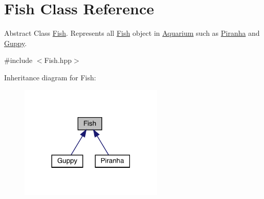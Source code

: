 \hypertarget{class_fish}{}\section{Fish Class Reference}
\label{class_fish}


Abstract Class \mbox{\hyperlink{class_fish}{Fish}}. Represents all \mbox{\hyperlink{class_fish}{Fish}} object in \mbox{\hyperlink{class_aquarium}{Aquarium}} such as \mbox{\hyperlink{class_piranha}{Piranha}} and \mbox{\hyperlink{class_guppy}{Guppy}}.  




{\ttfamily \#include $<$Fish.\+hpp$>$}



Inheritance diagram for Fish\+:\nopagebreak
\begin{figure}[H]
\begin{center}
\leavevmode
\includegraphics[width=194pt]{class_fish__inherit__graph}
\end{center}
\end{figure}
